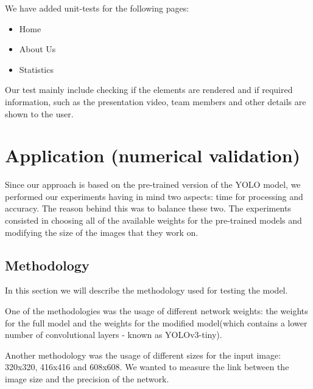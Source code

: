 \documentclass[runningheads,a4paper,11pt]{report}
\begin{document}
 We have added unit-tests for the following pages:
 \begin{itemize}
     \item Home
     \item About Us
     \item Statistics
 \end{itemize}
 
 Our test mainly include checking if the elements are rendered and if required information, such as the presentation video, team members and other details are shown to the user.

\chapter{Application (numerical validation)}
\label{chapter:application}

Since our approach is based on the pre-trained version of the YOLO model, we performed our experiments having in mind two aspects: time for processing and accuracy. The reason behind this was to balance these two. The experiments consisted in choosing all of the available weights for the pre-trained models and modifying the size of the images that they work on.

\section{Methodology}
\label{section:methodology}
In this section we will describe the methodology used for testing the model.

One of the methodologies was the usage of different network weights: the weights for the full model and the weights for the modified model(which contains a lower number of convolutional layers - known as YOLOv3-tiny).

Another methodology was the usage of different sizes for the input image: 320x320, 416x416 and 608x608. We wanted to measure the link between the image size and the precision of the network.

\end{document}
